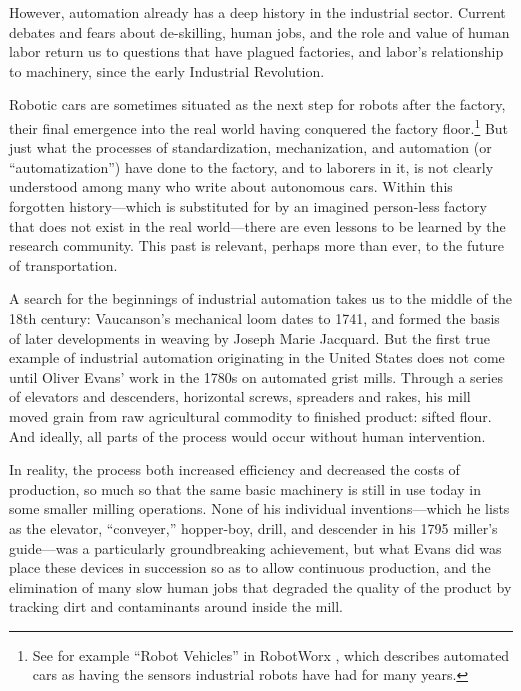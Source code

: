 However, automation already has a deep
history in the industrial sector. Current debates and fears about de-skilling, human jobs,
and the role and value of human labor return us to questions that have
plagued factories, and labor's relationship to machinery, since the
early Industrial Revolution.

Robotic cars are sometimes situated as
the next step for robots after the factory, their final emergence into
the real world having conquered the factory floor.\footnote{See for
  example ``Robot Vehicles'' in RobotWorx \cite{robotworx}, which describes automated cars as having the sensors
  industrial robots have had for many years.} But just what the
processes of standardization, mechanization, and automation (or
``automatization'') have done to the factory, and to laborers in it, is
not clearly understood among many who write about autonomous cars. Within this
forgotten history---which is substituted for by an imagined person-less
factory that does not exist in the real world---there are even lessons to be
learned by the research community. This past is relevant, perhaps
more than ever, to the future of transportation.

A search for the beginnings of industrial automation takes us to the middle of
the 18th century: Vaucanson's mechanical loom dates to 1741, and formed the basis of
 later developments in weaving by Joseph Marie Jacquard.\cite[p. 9]{dieboldImpact} 
But the first true example of industrial automation originating in the
United States does not come until Oliver Evans' work in the 1780s on
automated grist mills.\cite[p. 5]{roesmithYankee} Through a series of elevators and descenders,
horizontal screws, spreaders and rakes, his mill moved grain from raw
agricultural commodity to finished product: sifted flour. And ideally,
all parts of the process would occur without human intervention. 

In reality, the process both increased efficiency and decreased the costs
of production, so much so that the same basic machinery is still in
use today in some smaller milling operations.\cite{wyegrist} None of his individual
inventions---which he lists as the elevator, ``conveyer,'' hopper-boy,
drill, and descender in his 1795 miller's guide---was a particularly
groundbreaking achievement, but what Evans did was place these devices
in succession so as to allow continuous production, and the
elimination of many slow human jobs that degraded the quality of the
product by tracking dirt and contaminants around inside the
mill.\cite[p. 203]{evansMillguide} 

